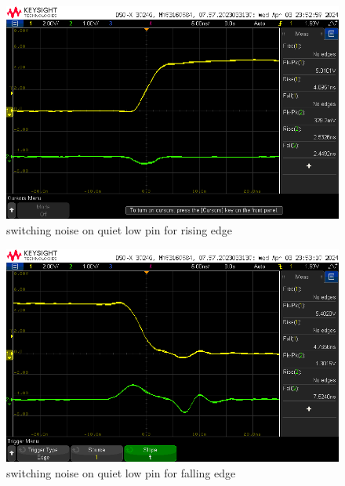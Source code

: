 \documentclass[a4paper,11pt]{article}%
\begin{document}
\begin{enumerate}
\begin{itemize}
		            \begin{figure}[H]
			            \centering
			            \includegraphics[scale=0.6]{figures/my_ard/d13_trig_ql_rise.png}
			            \caption{switching noise on quiet low pin for rising edge}
		            \end{figure}

		            \begin{figure}[H]
			            \centering
			            \includegraphics[scale=0.6]{figures/my_ard/d13_trig_ql_fall.png}
			            \caption{switching noise on quiet low pin for falling edge}
		            \end{figure}


\end{itemize}
\end{enumerate}
\end{document}
